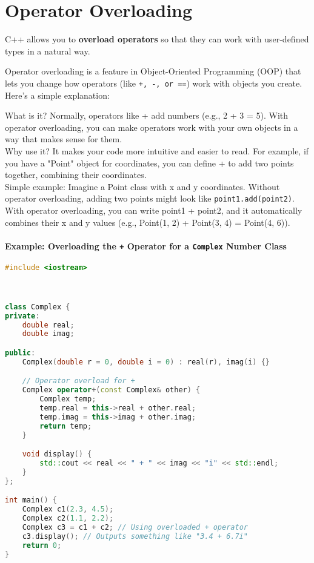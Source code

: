 \documentclass[a4paper,12pt]{article}
\begin{document}
\section{Operator Overloading}
C++ allows you to \textbf{overload operators} so that they can work with user-defined types in a natural way.

Operator overloading is a feature in Object-Oriented Programming (OOP) that lets you change how operators (like \verb|+, -, or ==|) work with objects you create. Here's a simple explanation:

What is it? Normally, operators like + add numbers (e.g., 2 + 3 = 5). With operator overloading, you can make operators work with your own objects in a way that makes sense for them.\\
Why use it? It makes your code more intuitive and easier to read. For example, if you have a "Point" object for coordinates, you can define + to add two points together, combining their coordinates.\\
Simple example: Imagine a Point class with x and y coordinates. Without operator overloading, adding two points might look like \verb|point1.add(point2)|. With operator overloading, you can write point1 + point2, and it automatically combines their x and y values (e.g., Point(1, 2) + Point(3, 4) = Point(4, 6)).

\paragraph{Example: Overloading the \texttt{+} Operator for a \texttt{Complex} Number Class}
\begin{lstlisting}[language=C++]
#include <iostream>



class Complex {
private:
    double real;
    double imag;

public:
    Complex(double r = 0, double i = 0) : real(r), imag(i) {}

    // Operator overload for +
    Complex operator+(const Complex& other) {
        Complex temp;
        temp.real = this->real + other.real;
        temp.imag = this->imag + other.imag;
        return temp;
    }

    void display() {
        std::cout << real << " + " << imag << "i" << std::endl;
    }
};

int main() {
    Complex c1(2.3, 4.5);
    Complex c2(1.1, 2.2);
    Complex c3 = c1 + c2; // Using overloaded + operator
    c3.display(); // Outputs something like "3.4 + 6.7i"
    return 0;
}
\end{lstlisting}
\end{document}
